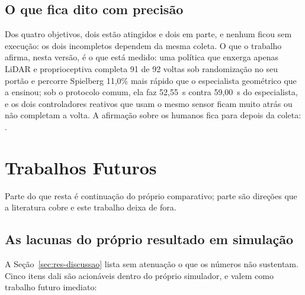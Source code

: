 \subsection*{O que fica dito com precisão}

Dos quatro objetivos, dois estão atingidos e dois em parte, e nenhum ficou sem
execução: os dois incompletos dependem da mesma coleta. O que o trabalho afirma,
nesta versão, é o que está medido: uma política que enxerga apenas LiDAR e
proprioceptiva completa 91 de 92 voltas sob randomização no seu portão e percorre
Spielberg 11,0\% mais rápido que o especialista geométrico que a ensinou; sob o
protocolo comum, ela faz 52,55~s contra 59,00~s do especialista, e os dois
controladores reativos que usam o mesmo sensor ficam muito atrás ou não
completam a volta. A afirmação sobre os humanos fica para depois da coleta:
.

\section*{Trabalhos Futuros}

Parte do que resta é continuação do próprio comparativo; parte são direções que a
literatura cobre e este trabalho deixa de fora.

\subsection*{As lacunas do próprio resultado em simulação}

A Seção~\ref{sec:res-discussao} lista sem atenuação o que os números não
sustentam. Cinco itens dali são acionáveis dentro do próprio simulador, e valem
como trabalho futuro imediato:

